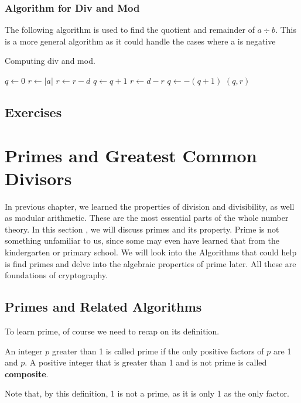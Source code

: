     \subsubsection*{Algorithm for Div and Mod}
        The following algorithm is used to find the quotient and remainder of $a \div b$.
        This is a more general algorithm as it could handle the cases where a is negative
    \begin{algorithm}
        \caption{Computing div and mod.}
        \begin{algorithmic}
            \State $q \gets 0$
            \State $r \gets |a|$
                \State $r \gets r - d$
                \State $q \gets q + 1$
            \EndWhile
                \State $r \gets d - r$
                \State $q \gets -(q + 1)$
            \EndIf
            \State \Return $(q, r)$ 
        \EndProcedure
        \end{algorithmic}
        \end{algorithm}

    \subsection{Exercises}


\section{Primes and Greatest Common Divisors}
        In previous chapter, we learned the properties of division and divisibility, as well as
        modular arithmetic. These are the most essential parts of the whole number theory. In this section
        , we will discuss primes and its property. Prime is not something unfamiliar to us, since some may
        even have learned that from the kindergarten or primary school. We will look into the Algorithms
        that could help is find primes and delve into the algebraic properties of prime later. All these
        are foundations of cryptography.
    \subsection{Primes and Related Algorithms}
        To learn prime, of course we need to recap on its definition.
        \begin{definition}  
            An integer $p$ greater than 1 is called prime if the only positive factors of $p$ are 1 and $p$.
            A positive integer that is greater than 1 and is not prime is called \textbf{composite}.
        \end{definition}    
        Note that, by this definition, 1 is not a prime, as it is only 1 as the only factor.

